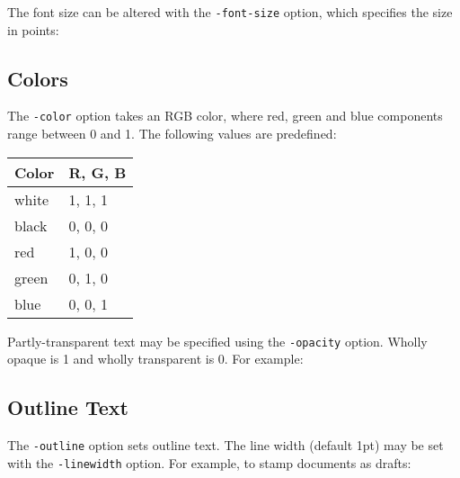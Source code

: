 \documentclass{book}
\begin{document}
  The font size can be altered with the \texttt{-font-size} option, which
specifies the size in points:

\noindent{}

  \subsection{Colors}
  The \texttt{-color} option takes an RGB color, where red, green and blue
components range between 0 and 1. The following values are predefined:

  \vspace{2mm}
  \begin{tabular}{ll}
    \textbf{Color} & \textbf{R, G, B} \\ \hline
     white & 1, 1, 1\\
     black & 0, 0, 0\\
     red & 1, 0, 0\\
     green & 0, 1, 0\\
     blue & 0, 0, 1\\
  \end{tabular}


\noindent{}

\noindent Partly-transparent text may be specified using the \verb!-opacity! option. Wholly opaque is 1 and wholly transparent is 0. For example:




\noindent{}


\subsection{Outline Text}

  The \texttt{-outline} option sets outline text. The line width (default 1pt)
  may be set with the \texttt{-linewidth} option. For example, to stamp
  documents as drafts:


\noindent{}
\end{document}
